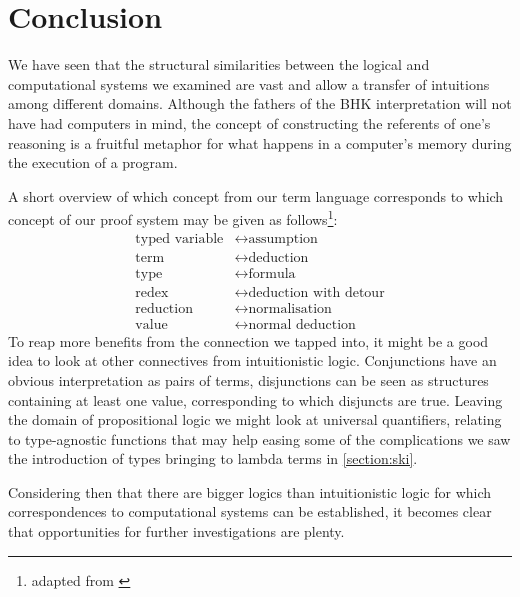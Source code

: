 \chapter{Conclusion}

We have seen that the structural similarities between the logical and
computational systems we examined are vast and allow a transfer of intuitions
among different domains. Although the fathers of the BHK interpretation will not
have had computers in mind, the concept of constructing the referents of one's
reasoning is a fruitful metaphor for what happens in a computer's memory during
the execution of a program.

A short overview of which concept from our term language corresponds to which
concept of our proof system may be given as follows\footnote{adapted from
\cite[67]{lectures}}:
\begin{align*}
\mbox{typed variable} &\leftrightarrow \mbox{assumption} \\
\mbox{term} &\leftrightarrow \mbox{deduction} \\
\mbox{type} &\leftrightarrow \mbox{formula} \\
\mbox{redex} &\leftrightarrow \mbox{deduction with detour} \\
\mbox{reduction} &\leftrightarrow \mbox{normalisation} \\
\mbox{value} &\leftrightarrow \mbox{normal deduction}
\end{align*}
To reap more benefits from the connection we tapped
into, it might be a good idea to look at other connectives from intuitionistic
logic. Conjunctions have an obvious interpretation as pairs of terms,
disjunctions can be seen as structures containing at least one value,
corresponding to which disjuncts are true. Leaving the domain of propositional
logic we might look at universal quantifiers, relating to type-agnostic
functions that may help easing some of the complications we saw the introduction
of types bringing to lambda terms in \ref{section:ski}.

Considering then that there are bigger logics than intuitionistic logic for
which correspondences to computational systems can be established, it becomes
clear that opportunities for further investigations are plenty.
